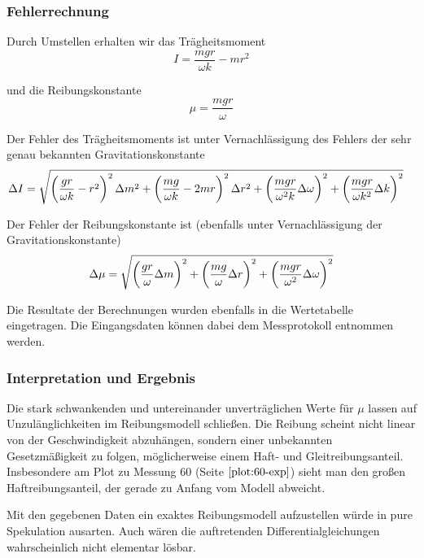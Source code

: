 \documentclass[a4paper,german,12pt,smallheadings]{scrartcl}
\begin{document}
\subsubsection{Fehlerrechnung}
Durch Umstellen erhalten wir das Trägheitsmoment
\begin{equation}
  I = \frac{mgr}{\omega k} - mr^2
\end{equation}

und die Reibungskonstante
\begin{equation}
  \mu = \frac{mgr}{\omega}
\end{equation}

Der Fehler des Trägheitsmoments ist unter Vernachlässigung des Fehlers der sehr
genau bekannten Gravitationskonstante %
\begin{align*}
  \Delta I
  &= \sqrt{
  \del{\frac{gr}{\omega k} - r^2}^2 \Delta m^2 +
  \del{\frac{mg}{\omega k} - 2mr}^2 \Delta r^2 +
  \del{\frac{mgr}{\omega^2k} \Delta \omega}^2 +
  \del{\frac{mgr}{\omega k^2} \Delta k}^2
  }
\end{align*}

Der Fehler der Reibungskonstante ist (ebenfalls unter Vernachlässigung der
Gravitationskonstante)
\begin{equation}
  \Delta \mu = \sqrt{
    \del{\frac{gr}{\omega} \Delta m}^2 +
    \del{\frac{mg}{\omega} \Delta r}^2 +
    \del{\frac{mgr}{\omega^2} \Delta \omega}^2
  }
\end{equation}

Die Resultate der Berechnungen wurden ebenfalls in die Wertetabelle
eingetragen. Die Eingangsdaten können dabei dem Messprotokoll entnommen werden.

\subsubsection{Interpretation und Ergebnis}
Die stark schwankenden und untereinander unverträglichen Werte für $\mu$ lassen
auf Unzulänglichkeiten im Reibungsmodell schließen. Die Reibung scheint nicht
linear von der Geschwindigkeit abzuhängen, sondern einer unbekannten
Gesetzmäßigkeit zu folgen, möglicherweise einem Haft- und Gleitreibungsanteil.
Insbesondere am Plot zu Messung 60 (Seite $\pageref{plot:60-exp}$) sieht man
den großen Haftreibungsanteil, der gerade zu Anfang vom Modell abweicht.

Mit den gegebenen Daten ein exaktes Reibungsmodell aufzustellen würde in pure
Spekulation ausarten. Auch wären die auftretenden Differentialgleichungen
wahrscheinlich nicht elementar lösbar.
\end{document}
